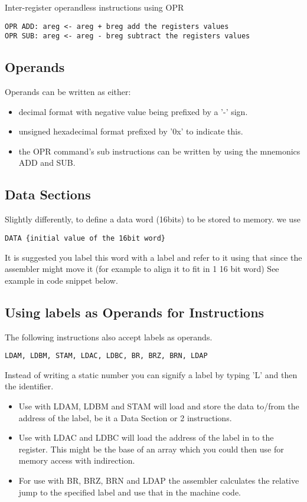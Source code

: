 \documentclass[10pt,a4paper]{article}
\begin{document}
Inter-register operandless instructions using OPR
\begin{verbatim}
OPR ADD: areg <- areg + breg add the registers values
OPR SUB: areg <- areg - breg subtract the registers values
\end{verbatim}

\subsection*{Operands}
Operands can be written as either:
\begin{itemize}
\item decimal format with negative value being prefixed by a '-' sign.
\item unsigned hexadecimal format prefixed by '0x' to indicate this.
\item the OPR command's sub instructions can be written by using the mnemonics ADD and SUB.
\end{itemize}

\subsection*{Data Sections}
Slightly differently, to define a data word (16bits) to be stored to memory.
we use 
\begin{verbatim}
DATA {initial value of the 16bit word}
\end{verbatim}

It is suggested you label this word with a label and refer to it using that since the assembler might move it (for example to align it to fit in 1 16 bit word) See example in code snippet below.

\subsection*{Using labels as Operands for Instructions}

The following instructions also accept labels as operands.

\begin{verbatim}LDAM, LDBM, STAM, LDAC, LDBC, BR, BRZ, BRN, LDAP\end{verbatim}

Instead of writing a static number you can signify a label by typing 'L' and then the identifier.
\break
\begin{itemize}
\item Use with LDAM, LDBM and STAM will load and store the data to/from the address of the label, be it a Data Section or 2 instructions.

\item Use with LDAC and LDBC will load the address of the label in to the register. This might be the base of an array which you could then use for memory access with indirection. 

\item For use with BR, BRZ, BRN and LDAP the assembler calculates the relative jump to the specified label and use that in the machine code.
\end{itemize}
\end{document}

